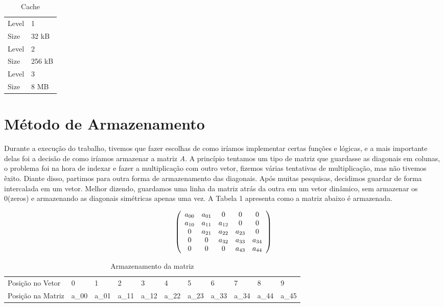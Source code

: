 \documentclass[12pt]{article}
\begin{document}
\begin{table}[H]
\centering
\caption{Cache}
\label{my-label}
\begin{tabular}{ll}
Level        & 1                              \\
Size         & 32 kB                          \\ \hline
Level        & 2                              \\
Size         & 256 kB                         \\ \hline
Level        & 3                              \\
Size         & 8 MB
\end{tabular}
\end{table}

\section{Método de Armazenamento} \label{sec:firstpage}

Durante a execução do trabalho, tivemos que fazer escolhas de como iríamos implementar certas funções e lógicas, e a mais importante delas foi a decisão de como iríamos armazenar a matriz \textit{A}. A princípio tentamos um tipo de matriz que guardasse as diagonais em colunas, o problema foi na hora de indexar e fazer a multiplicação com outro vetor, fizemos várias tentativas de multiplicação, mas não tivemos êxito. Diante disso, partimos para outra forma de armazenamento das diagonais. Após muitas pesquisas, decidimos guardar de forma intercalada em um vetor. Melhor dizendo, guardamos uma linha da matriz atrás da outra em um vetor dinâmico, sem armazenar os 0(zeros) e armazenando as diagonais simétricas apenas uma vez. A Tabela 1 apresenta como a matriz abaixo é armazenada.

$$ \left(
  \begin{array}{c c c c c}
     a_{00} & a_{01} & 0      & 0      & 0\\
     a_{10} & a_{11} & a_{12} & 0      & 0\\
     0      & a_{21} & a_{22} & a_{23} & 0\\
     0      & 0      & a_{32} & a_{33} & a_{34}\\
     0      & 0      & 0      & a_{43} & a_{44}\\
  \end{array} \right)
$$

\begin{table}[H]
\centering
\caption{Armazenamento da matriz}
\label{my-label}
\begin{tabular}{l|l|l|l|l|l|l|l|l|l|l|}
\cline{2-11}
Posição no Vetor  & 0   & 1   & 2   & 3   & 4   & 5   & 6   & 7   & 8   & 9   \\ \cline{2-11}
Posição na Matriz & a_{00} & a_{01} & a_{11} & a_{12} & a_{22} & a_{23} & a_{33} & a_{34} & a_{44} & a_{45} \\ \cline{2-11}
\end{tabular}
\end{table}
\end{document}
